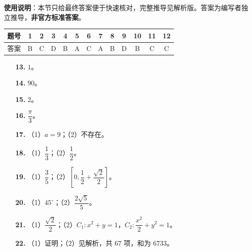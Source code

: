 
\begin{gknotice}
\textbf{使用说明}：本节只给最终答案便于快速核对，完整推导见解析版。答案为编写者独立推导，\textbf{非官方标准答案}。
\end{gknotice}

\begin{center}\begin{tabular}{ccccccccccccc}
\toprule
题号 & 1 & 2 & 3 & 4 & 5 & 6 & 7 & 8 & 9 & 10 & 11 & 12 \\
\midrule
答案 & B & C & D & B & A & C & A & B & D & B & C & C \\
\bottomrule
\end{tabular}\end{center}

\begin{itemize}[leftmargin=2.6em]
  \item[\textbf{13.}] $1$。
  \item[\textbf{14.}] $90$。
  \item[\textbf{15.}] $2$。
  \item[\textbf{16.}] $\dfrac\pi3$。
\end{itemize}

\begin{itemize}[leftmargin=2.6em]
  \item[\textbf{17.}] （1）$a=9$；（2）不存在。
  \item[\textbf{18.}] （1）$\dfrac13$；（2）$\dfrac12$。
  \item[\textbf{19.}] （1）$\dfrac35$；（2）$\left[0,\dfrac12+\dfrac{\sqrt2}{2}\right]$。
  \item[\textbf{20.}] （1）$45^\circ$；（2）$\dfrac{2\sqrt5}{5}$。
  \item[\textbf{21.}] （1）$\dfrac{\sqrt2}{2}$；（2）$C_1:x^2+y=1$，$C_2:\dfrac{x^2}{2}+y^2=1$。
  \item[\textbf{22.}] （1）证明；（2）见解析，共 $67$ 项，和为 $6733$。
\end{itemize}
